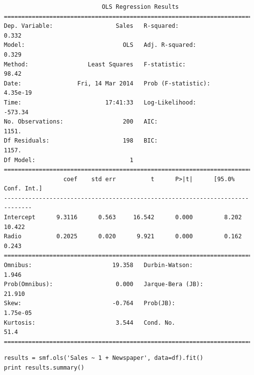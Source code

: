 \documentclass[12pt,fleqn]{article}\usepackage{../common}
\begin{document}
\begin{verbatim}
                            OLS Regression Results                            
==============================================================================
Dep. Variable:                  Sales   R-squared:                       0.332
Model:                            OLS   Adj. R-squared:                  0.329
Method:                 Least Squares   F-statistic:                     98.42
Date:                Fri, 14 Mar 2014   Prob (F-statistic):           4.35e-19
Time:                        17:41:33   Log-Likelihood:                -573.34
No. Observations:                 200   AIC:                             1151.
Df Residuals:                     198   BIC:                             1157.
Df Model:                           1                                         
==============================================================================
                 coef    std err          t      P>|t|      [95.0% Conf. Int.]
------------------------------------------------------------------------------
Intercept      9.3116      0.563     16.542      0.000         8.202    10.422
Radio          0.2025      0.020      9.921      0.000         0.162     0.243
==============================================================================
Omnibus:                       19.358   Durbin-Watson:                   1.946
Prob(Omnibus):                  0.000   Jarque-Bera (JB):               21.910
Skew:                          -0.764   Prob(JB):                     1.75e-05
Kurtosis:                       3.544   Cond. No.                         51.4
==============================================================================
\end{verbatim}

\begin{verbatim}
results = smf.ols('Sales ~ 1 + Newspaper', data=df).fit()
print results.summary()
\end{verbatim}
\end{document}
